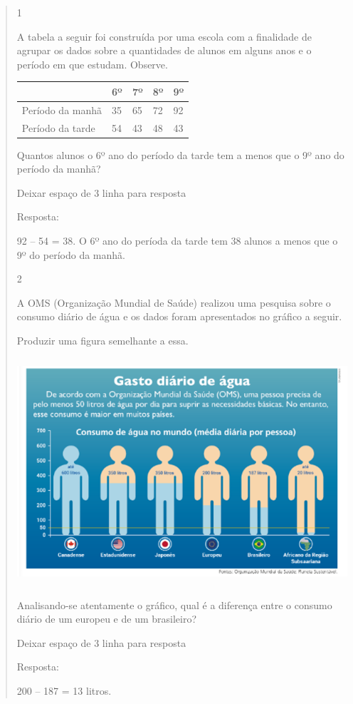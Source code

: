 \begin{mdframed}[linewidth=2pt,linecolor=salmao,roundcorner=2pt]
\begin{itemize}
{\begin{itemize}
\begin{escolha}
{\begin{quote}
{\begin{escolha}
{{{

\num{1}

A tabela a seguir foi construída por uma escola com a finalidade de agrupar os
dados sobre a quantidades de alunos em alguns anos e o período em que
estudam. Observe.

\begin{longtable}[]{@{}lllll@{}}
\toprule
& 6º & 7º & 8º & 9º\tabularnewline
\midrule
\endhead
Período da manhã & 35 & 65 & 72 & 92\tabularnewline
Período da tarde & 54 & 43 & 48 & 43\tabularnewline
\bottomrule
\end{longtable}

Quantos alunos o 6º ano do período da tarde tem a menos que o 9º
ano do período da manhã?

Deixar espaço de 3 linha para resposta

Resposta:

92 -- 54 = 38. O 6º ano do períoda da tarde tem 38 alunos a
menos que o 9º do período da manhã.

\num{2}

A OMS (Organização Mundial de Saúde) realizou uma pesquisa sobre o
consumo diário de água e os dados foram apresentados no gráfico a seguir.

Produzir uma figura semelhante a essa.

\includegraphics[width=5.22545in,height=3.31695in]{media/image95.png}

Analisando-se atentamente o gráfico, qual é a diferença entre o
consumo diário de um europeu e de um brasileiro?

Deixar espaço de 3 linha para resposta

Resposta:

200 -- 187 = 13 litros.

}}}
\end{escolha}}
\end{quote}}
\end{escolha}
\end{itemize}}
\end{itemize}
\end{mdframed}
